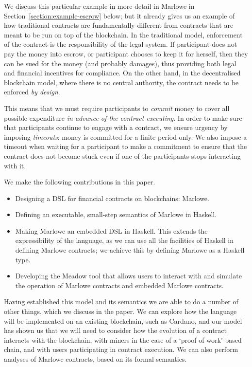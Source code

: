 \documentclass[runningheads]{llncs}
\begin{document}
We discuss this particular example in more detail in Marlowe in Section~\ref{section:example-escrow} below; but it 
already gives us an example of how traditional contracts are fundamentally different from contracts that are meant to 
be run on top of the blockchain. In the traditional model, enforcement of the contract is the responsibility of the 
legal system. If participant  does not pay the money into escrow, or participant  
chooses to keep it for herself, then they can be sued for the money (and probably damages), thus providing both legal 
and financial incentives for compliance. On the other hand, in the decentralised blockchain model, where there is no 
central authority, the contract needs to be enforced \emph{by design}. 

This means that we must require participants to \emph{commit} money to cover all possible expenditure \emph{in advance 
of the contract executing}. In order to make sure that participants continue to engage with a contract, we ensure 
urgency by imposing \emph{timeouts}: money is committed for a finite period only. We also impose a timeout when waiting 
for a participant to make a commitment to ensure that the contract does not become stuck even if one of the participants 
stops interacting with it.

We make the following contributions in this paper.
\begin{itemize}
\item
Designing a DSL for financial contracts on blockchains: Marlowe.
\item
Defining an executable, small-step semantics of Marlowe in Haskell.
\item 
Making Marlowe an embedded DSL in Haskell. This extends the expressibility of the language, as we can use all the 
facilities of Haskell in defining Marlowe contracts; we achieve this by defining Marlowe as  a Haskell 
 type.
\item
Developing the Meadow tool that allows users to interact with and simulate the operation of Marlowe contracts 
and embedded Marlowe contracts.
\end{itemize}

Having established this model and its semantics we are able to do a number of other things, which we discuss in the 
paper. We can explore how the language will be implemented on an existing blockchain, such as Cardano, and our model has 
shown us that we will need to consider how the evolution of a contract interacts with the blockchain, with miners in the 
case of a `proof of work'-based chain, and with users participating in contract execution. We can also perform analyses 
of Marlowe contracts, based on its formal semantics. 
\end{document}
